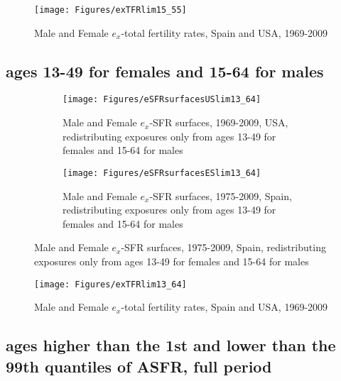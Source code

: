 \begin{figure}[ht!]
        \centering  
          \caption{Male and Female $e_x$-total fertility rates, Spain
          and USA, 1969-2009}
           \texttt{[image: Figures/exTFRlim15\_55]}
          \label{fig:exTFRlim15_55}
\end{figure}

\subsection{ages 13-49 for females and 15-64 for males}

\begin{figure}
        \centering
        \begin{subfigure}
                \centering
                \caption{Male and Female $e_x$-SFR surfaces, 1969-2009, USA,
                redistributing exposures only from ages 13-49 for females and 15-64 for males}
                \texttt{[image: Figures/eSFRsurfacesUSlim13\_64]}
                \label{fig:exSFRsurfUSlim13_64}
        \end{subfigure}
        \begin{subfigure}
                \centering
                \caption{Male and Female $e_x$-SFR surfaces, 1975-2009, Spain,
                redistributing exposures only from ages 13-49 for females and 15-64 for males}
                \texttt{[image: Figures/eSFRsurfacesESlim13\_64]} 
                \label{fig:exSFRsurfESlim13_64}
        \end{subfigure}
\end{figure}

\begin{figure}[ht!]
        \centering  
          \caption{Male and Female $e_x$-total fertility rates, Spain
          and USA, 1969-2009}
           \texttt{[image: Figures/exTFRlim13\_64]}
          \label{fig:exTFRlim13_64}
\end{figure}

\subsection{ages higher than the 1st and lower than the 99th quantiles of ASFR,
full period}

